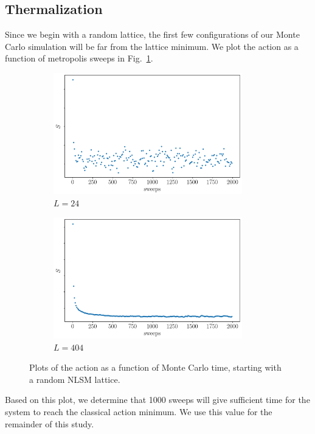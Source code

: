 \documentclass[12pt]{report}
\begin{document}
\subsection{Thermalization}
Since we begin with a random lattice, the first few configurations of our Monte Carlo simulation will be far from the lattice minimum. We plot the action as a function of metropolis sweeps in Fig.~\ref{fig:therm}.
\begin{figure}[h]
  \centering
      \begin{subfigure}[b]{0.5\textwidth}\centering
        \includegraphics[width=0.9\textwidth]{imgs/therm24.png}
        \caption{$L=24$}
      \end{subfigure}%
      \hfill
      \begin{subfigure}[b]{0.5\textwidth}\centering
        \includegraphics[width=0.9\textwidth]{imgs/therm404.png}
        \caption{$L=404$}
      \end{subfigure}
      \hfill
      \caption{\label{fig:therm} Plots of the action as a function of Monte Carlo time, starting with a random NLSM lattice.}
\end{figure}
Based on this plot, we determine that 1000 sweeps will give sufficient time for the system to reach the classical action minimum. We use this value for the remainder of this study.
\end{document}
